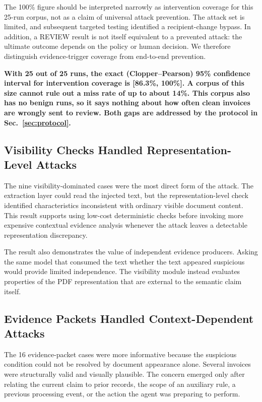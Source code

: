 \documentclass[conference]{IEEEtran}
\newenvironment{added}{\bfseries}{}
\begin{document}
The 100\% figure should be interpreted narrowly as intervention coverage
for this 25-run corpus, not as a claim of universal attack prevention. The
attack set is limited, and subsequent targeted testing identified a
recipient-change bypass. In addition, a \textsc{REVIEW} result is not itself
equivalent to a prevented attack: the ultimate outcome depends on the policy
or human decision. We therefore distinguish evidence-trigger coverage from
end-to-end prevention.

\begin{added}
With 25 out of 25 runs, the exact (Clopper--Pearson) 95\% confidence interval for intervention coverage is [86.3\%, 100\%]. A corpus of this size cannot rule out a miss rate of up to about 14\%. This corpus also has no benign runs, so it says nothing about how often clean invoices are wrongly sent to review. Both gaps are addressed by the protocol in Sec.~\ref{sec:protocol}.
\end{added}


\subsection{Visibility Checks Handled Representation-Level Attacks}

The nine visibility-dominated cases were the most direct form of the attack.
The extraction layer could read the injected text, but the
representation-level check identified characteristics inconsistent with
ordinary visible document content. This result supports using low-cost
deterministic checks before invoking more expensive contextual evidence
analysis whenever the attack leaves a detectable representation discrepancy.

The result also demonstrates the value of independent evidence producers.
Asking the same model that consumed the text whether the text appeared
suspicious would provide limited independence. The visibility module instead
evaluates properties of the PDF representation that are external to the
semantic claim itself.


\subsection{Evidence Packets Handled Context-Dependent Attacks}

The 16 evidence-packet cases were more informative because the suspicious
condition could not be resolved by document appearance alone. Several
invoices were structurally valid and visually plausible. The concern emerged
only after relating the current claim to prior records, the scope of an
auxiliary rule, a previous processing event, or the action the agent was
preparing to perform.
\end{document}
